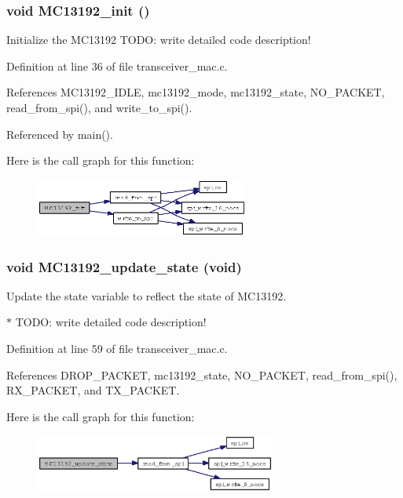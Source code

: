 \subsubsection{\setlength{\rightskip}{0pt plus 5cm}void MC13192\_\-init ()}\label{group__ro__transceiver__mac_g3b645fe6ce22a066678c3b54cfd59fef}


Initialize the MC13192 TODO: write detailed code description! 



Definition at line 36 of file transceiver\_\-mac.c.

References MC13192\_\-IDLE, mc13192\_\-mode, mc13192\_\-state, NO\_\-PACKET, read\_\-from\_\-spi(), and write\_\-to\_\-spi().

Referenced by main().

Here is the call graph for this function:\begin{figure}[H]
\begin{center}
\leavevmode
\includegraphics[width=199pt]{group__ro__transceiver__mac_g3b645fe6ce22a066678c3b54cfd59fef_cgraph}
\end{center}
\end{figure}
\subsubsection{\setlength{\rightskip}{0pt plus 5cm}void MC13192\_\-update\_\-state (void)}\label{group__ro__transceiver__mac_gafaa0125c377951f9b1599d1fb22f8a3}


Update the state variable to reflect the state of MC13192. 

$\ast$ TODO: write detailed code description! 

Definition at line 59 of file transceiver\_\-mac.c.

References DROP\_\-PACKET, mc13192\_\-state, NO\_\-PACKET, read\_\-from\_\-spi(), RX\_\-PACKET, and TX\_\-PACKET.

Here is the call graph for this function:\begin{figure}[H]
\begin{center}
\leavevmode
\includegraphics[width=224pt]{group__ro__transceiver__mac_gafaa0125c377951f9b1599d1fb22f8a3_cgraph}
\end{center}
\end{figure}
